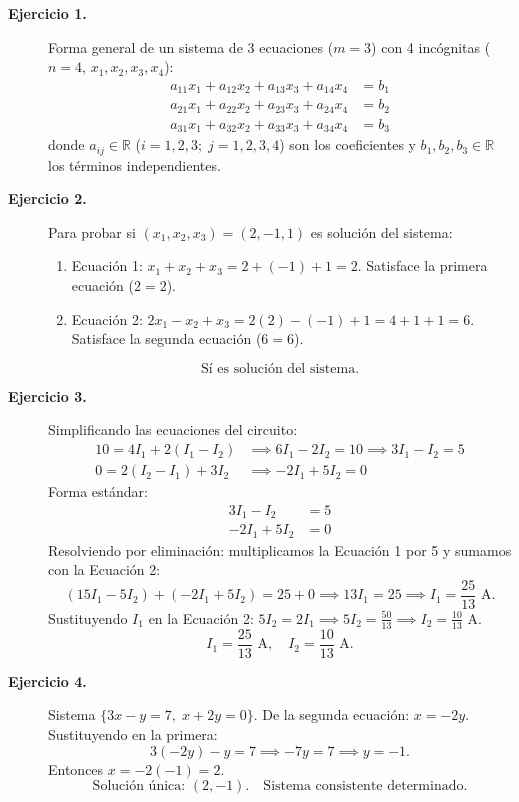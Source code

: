 \documentclass[11pt,letterpaper]{article}
\theoremstyle{definition}
\newcommand{\R}{\mathbb{R}}
\begin{document}
\begin{description}

\item[\textbf{Ejercicio 1.}]
Forma general de un sistema de 3 ecuaciones ($m=3$) con 4 incógnitas ($n=4$, $x_1, x_2, x_3, x_4$):
\[
\begin{aligned}
  a_{11}x_1 + a_{12}x_2 + a_{13}x_3 + a_{14}x_4 &= b_1 \\
  a_{21}x_1 + a_{22}x_2 + a_{23}x_3 + a_{24}x_4 &= b_2 \\
  a_{31}x_1 + a_{32}x_2 + a_{33}x_3 + a_{34}x_4 &= b_3
\end{aligned}
\]
donde $a_{ij} \in \R$ ($i=1,2,3;\; j=1,2,3,4$) son los coeficientes y $b_1, b_2, b_3 \in \R$ los términos independientes.

\item[\textbf{Ejercicio 2.}]
Para probar si $(x_1,x_2,x_3) = (2,-1,1)$ es solución del sistema:
\begin{enumerate}[label=(\roman*)]
  \item Ecuación 1: $x_1+x_2+x_3 = 2 + (-1) + 1 = 2$. Satisface la primera ecuación ($2=2$).
  \item Ecuación 2: $2x_1-x_2+x_3 = 2(2) - (-1) + 1 = 4 + 1 + 1 = 6$. Satisface la segunda ecuación ($6=6$).
\end{enumerate}
\[\boxed{\text{Sí es solución del sistema.}}\]

\item[\textbf{Ejercicio 3.}]
Simplificando las ecuaciones del circuito:
\begin{align*}
  10 = 4I_1 + 2(I_1-I_2) &\implies 6I_1 - 2I_2 = 10 \implies 3I_1 - I_2 = 5 \\
  0 = 2(I_2-I_1) + 3I_2 &\implies -2I_1 + 5I_2 = 0
\end{align*}
Forma estándar:
\[
\begin{aligned}
  3I_1 - I_2 &= 5 \\
  -2I_1 + 5I_2 &= 0
\end{aligned}
\]
Resolviendo por eliminación: multiplicamos la Ecuación 1 por 5 y sumamos con la Ecuación 2:
\[
(15I_1 - 5I_2) + (-2I_1 + 5I_2) = 25 + 0 \implies 13I_1 = 25 \implies I_1 = \frac{25}{13} \text{ A.}
\]
Sustituyendo $I_1$ en la Ecuación 2: $5I_2 = 2I_1 \implies 5I_2 = \frac{50}{13} \implies I_2 = \frac{10}{13} \text{ A.}$
\[\boxed{I_1 = \frac{25}{13}\text{ A},\quad I_2 = \frac{10}{13}\text{ A.}}\]

\item[\textbf{Ejercicio 4.}]
Sistema $\{3x-y=7,\; x+2y=0\}$.
De la segunda ecuación: $x = -2y$. Sustituyendo en la primera:
\[
3(-2y) - y = 7 \implies -7y = 7 \implies y = -1.
\]
Entonces $x = -2(-1) = 2$.
\[\boxed{\text{Solución única: }(2,-1).\quad \text{Sistema consistente determinado.}}\]


\end{description}
\end{document}
